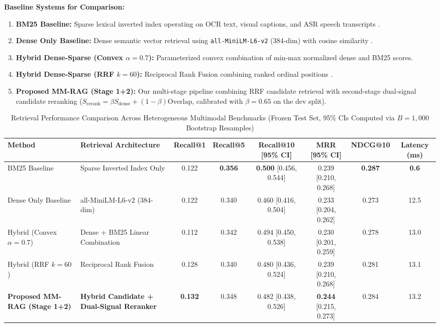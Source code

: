 \documentclass[conference]{IEEEtran}
\begin{document}
\textbf{Baseline Systems for Comparison:}
\begin{enumerate}
    \item \textbf{BM25 Baseline:} Sparse lexical inverted index operating on OCR text, visual captions, and ASR speech transcripts \cite{robertson2009bm25}.
    \item \textbf{Dense Only Baseline:} Dense semantic vector retrieval using \texttt{all-MiniLM-L6-v2} (384-dim) with cosine similarity \cite{reimers2019sbert}.
    \item \textbf{Hybrid Dense-Sparse (Convex $\alpha=0.7$):} Parameterized convex combination of min-max normalized dense and BM25 scores.
    \item \textbf{Hybrid Dense-Sparse (RRF $k=60$):} Reciprocal Rank Fusion combining ranked ordinal positions \cite{cormack2009rrf}.
    \item \textbf{Proposed MM-RAG (Stage 1+2):} Our multi-stage pipeline combining RRF candidate retrieval with second-stage dual-signal candidate reranking ($S_{\text{rerank}} = \beta S_{\text{dense}} + (1-\beta)\text{Overlap}$, calibrated with $\beta = 0.65$ on the dev split).
\end{enumerate}

\begin{table}[t]
\centering
\caption{Retrieval Performance Comparison Across Heterogeneous Multimodal Benchmarks (Frozen Test Set, 95\% CIs Computed via $B=1,000$ Bootstrap Resamples)}
\label{tab:main_results}
\begin{tabular}{@{}llcccccc@{}}
\toprule
\textbf{Method} & \textbf{Retrieval Architecture} & \textbf{Recall@1} & \textbf{Recall@5} & \textbf{Recall@10 [95\% CI]} & \textbf{MRR [95\% CI]} & \textbf{NDCG@10} & \textbf{Latency (ms)} \\ \midrule
BM25 Baseline & Sparse Inverted Index Only & 0.122 & \textbf{0.356} & \textbf{0.500} [0.456, 0.544] & 0.239 [0.210, 0.268] & \textbf{0.287} & \textbf{0.6} \\
Dense Only Baseline & all-MiniLM-L6-v2 (384-dim) & 0.122 & 0.340 & 0.460 [0.416, 0.504] & 0.233 [0.204, 0.262] & 0.273 & 12.5 \\
Hybrid (Convex $\alpha=0.7$) & Dense + BM25 Linear Combination & 0.112 & 0.342 & 0.494 [0.450, 0.538] & 0.230 [0.201, 0.259] & 0.278 & 13.0 \\
Hybrid (RRF $k=60$) & Reciprocal Rank Fusion & 0.128 & 0.340 & 0.480 [0.436, 0.524] & 0.239 [0.210, 0.268] & 0.281 & 13.1 \\
\textbf{Proposed MM-RAG (Stage 1+2)} & \textbf{Hybrid Candidate + Dual-Signal Reranker} & \textbf{0.132} & 0.348 & 0.482 [0.438, 0.526] & \textbf{0.244} [0.215, 0.273] & 0.284 & 13.2 \\ \bottomrule
\end{tabular}
\end{table}
\end{document}
